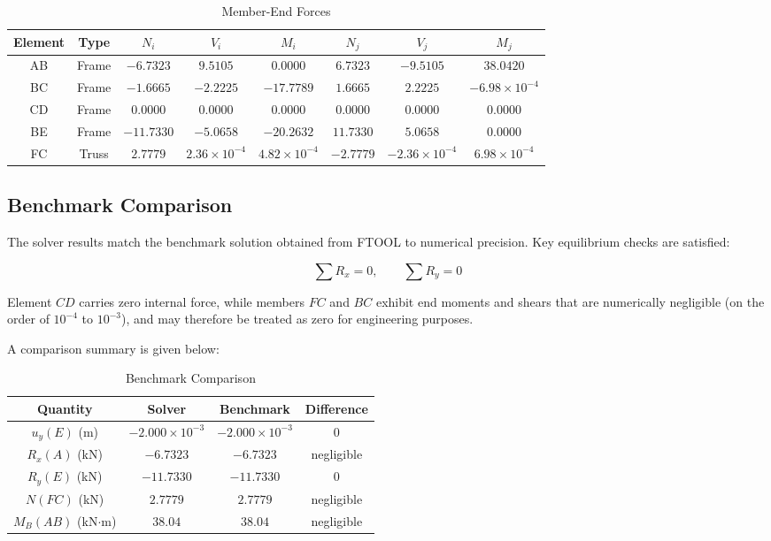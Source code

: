 \begin{table}[H]
\centering
\caption{Member-End Forces}
\begin{tabular}{cccccccc}
\toprule
Element & Type & $N_i$ & $V_i$ & $M_i$ & $N_j$ & $V_j$ & $M_j$ \\
\midrule
AB & Frame & $-6.7323$ & $9.5105$ & $0.0000$ & $6.7323$ & $-9.5105$ & $38.0420$ \\
BC & Frame & $-1.6665$ & $-2.2225$ & $-17.7789$ & $1.6665$ & $2.2225$ & $-6.98\times10^{-4}$ \\
CD & Frame & $0.0000$ & $0.0000$ & $0.0000$ & $0.0000$ & $0.0000$ & $0.0000$ \\
BE & Frame & $-11.7330$ & $-5.0658$ & $-20.2632$ & $11.7330$ & $5.0658$ & $0.0000$ \\
FC & Truss & $2.7779$ & $2.36\times10^{-4}$ & $4.82\times10^{-4}$ & $-2.7779$ & $-2.36\times10^{-4}$ & $6.98\times10^{-4}$ \\
\bottomrule
\end{tabular}
\end{table}

\subsection{Benchmark Comparison}

The solver results match the benchmark solution obtained from FTOOL to numerical precision. Key equilibrium checks are satisfied:

\[
\sum R_x = 0, \qquad \sum R_y = 0
\]

Element $CD$ carries zero internal force, while members $FC$ and $BC$ exhibit end moments and shears that are numerically negligible (on the order of $10^{-4}$ to $10^{-3}$), and may therefore be treated as zero for engineering purposes.

A comparison summary is given below:

\begin{table}[H]
\centering
\caption{Benchmark Comparison}
\begin{tabular}{cccc}
\toprule
Quantity & Solver & Benchmark & Difference \\
\midrule
$u_y(E)$ (m) & $-2.000\times10^{-3}$ & $-2.000\times10^{-3}$ & 0 \\
$R_x(A)$ (kN) & $-6.7323$ & $-6.7323$ & negligible \\
$R_y(E)$ (kN) & $-11.7330$ & $-11.7330$ & 0 \\
$N(FC)$ (kN) & $2.7779$ & $2.7779$ & negligible \\
$M_B(AB)$ (kN$\cdot$m) & $38.04$ & $38.04$ & negligible \\
\bottomrule
\end{tabular}
\end{table}

